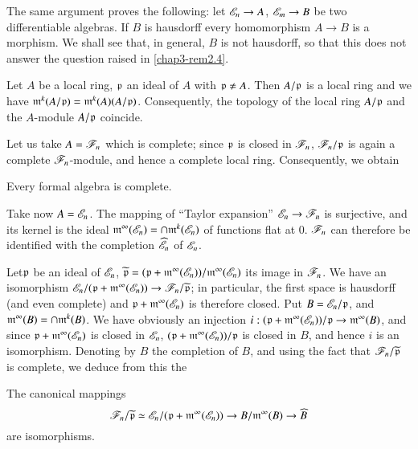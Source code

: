 \begin{remark}\label{chap3-rem3.15}
The same argument proves the following: let $\mathscr{E}_{n}\to A$, $\mathscr{E}_{m}\to B$ be two differentiable algebras. If $B$ is hausdorff every homomorphism $A\to B$ is a morphism. We shall see that, in general, $B$ is not hausdorff, so that this does not answer the question raised in \ref{chap3-rem2.4}.
\end{remark}

Let $A$ be a local ring, $\mathfrak{p}$ an ideal of $A$ with $\mathfrak{p}\neq A$. Then $A/\mathfrak{p}$ is a local ring and we have $\mathfrak{m}^{k}(A/\mathfrak{p})=\mathfrak{m}^{k}(A)(A/\mathfrak{p})$. Consequently, the topology of the local ring $A/\mathfrak{p}$ and the $A$-module $A/\mathfrak{p}$ coincide.

Let us take $A=\mathscr{F}_{n}$ which is complete; since $\mathfrak{p}$ is closed in $\mathscr{F}_{n}$, $\mathscr{F}_{n}/\mathfrak{p}$ is again a complete $\mathscr{F}_{n}$-module, and hence a complete local ring. Consequently, we obtain

\begin{proposition}\label{chap3-prop3.16}
Every formal algebra is complete.
\end{proposition}

Take now $A=\mathscr{E}_{n}$. The mapping of ``Taylor expansion'' $\mathscr{E}_{n}\to \mathscr{F}_{n}$ is surjective, and its kernel is the ideal $\mathfrak{m}^{\infty}(\mathscr{E}_{n})=\cap \mathfrak{m}^{k}(\mathscr{E}_{n})$ of functions flat at $0$. $\mathscr{F}_{n}$ can therefore be identified with the completion $\widehat{\mathscr{E}}_{n}$ of $\mathscr{E}_{n}$.

Let\pageoriginale $\mathfrak{p}$ be an ideal of $\mathscr{E}_{n}$, $\widetilde{\mathfrak{p}}=(\mathfrak{p}+\mathfrak{m}^{\infty}(\mathscr{E}_{n}))/\mathfrak{m}^{\infty}(\mathscr{E}_{n})$ its image in $\mathscr{F}_{n}$. We have an isomorphism $\mathscr{E}_{n}/(\mathfrak{p}+\mathfrak{m}^{\infty}(\mathscr{E}_{n}))\to \mathscr{F}_{n}/\widetilde{\mathfrak{p}}$; in particular, the first space is hausdorff (and even complete) and $\mathfrak{p}+\mathfrak{m}^{\infty}(\mathscr{E}_{n})$ is therefore closed. Put $B=\mathscr{E}_{n}/\mathfrak{p}$, and $\mathfrak{m}^{\infty}(B)=\cap \mathfrak{m}^{k}(B)$. We have obviously an injection $i:(\mathfrak{p}+\mathfrak{m}^{\infty}(\mathscr{E}_{n}))/\mathfrak{p}\to \mathfrak{m}^{\infty}(B)$, and since $\mathfrak{p}+\mathfrak{m}^{\infty}(\mathscr{E}_{n})$ is closed in $\mathscr{E}_{n}$, $(\mathfrak{p}+\mathfrak{m}^{\infty}(\mathscr{E}_{n}))/\mathfrak{p}$ is closed in $B$, and hence $i$ is an isomorphism. Denoting by $\widehat{B}$ the completion of $B$, and using the fact that $\mathscr{F}_{n}/\widetilde{\mathfrak{p}}$ is complete, we deduce from this the

\begin{proposition}\label{chap3-prop3.17}
The canonical mappings
$$
\mathscr{F}_{n}/\widetilde{\mathfrak{p}}\simeq \mathscr{E}_{n}/(\mathfrak{p}+\mathfrak{m}^{\infty}(\mathscr{E}_{n}))\to B/\mathfrak{m}^{\infty}(B)\to \widehat{B}
$$
are isomorphisms.
\end{proposition}

